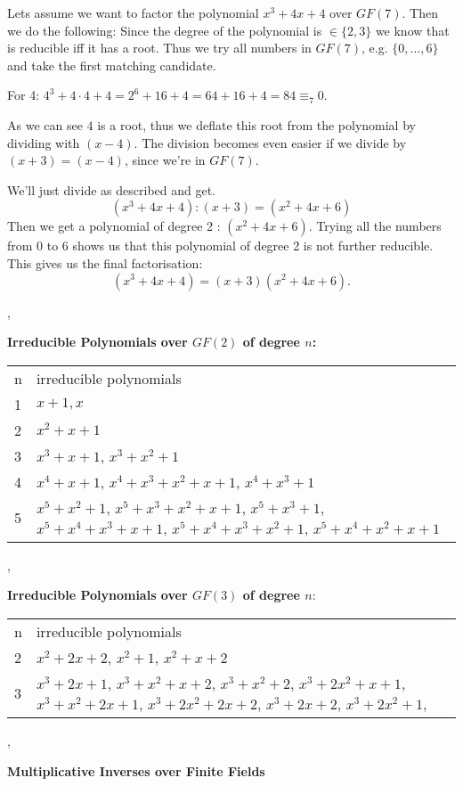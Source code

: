 Lets assume we want to factor the polynomial $x^3+4x+4$ over $GF(7)$. Then we do
the following: Since the degree of the polynomial is $\in\{2,3\}$ we know that
is reducible iff it has a root. Thus we try all numbers in $GF(7)$, e.g.
$\{0,\ldots,6\}$ and take the first matching candidate.

For 4: $4^3+4\cdot 4 + 4 = 2^6 +16 + 4 = 64 + 16 + 4 = 84 \equiv_7 0$.

As we can see $4$ is a root, thus we deflate this root from the polynomial by
dividing with $(x-4)$. The division becomes even easier if we divide by
$(x+3)=(x-4)$, since we're in $GF(7)$.

We'll just divide as described and get.
\[
(x^3+4x+4) : (x+3) = (x^2+4x+6)
\]
Then we get a polynomial of degree 2 : $(x^2+4x+6)$. Trying all the numbers from
0 to 6 shows us that this polynomial of degree 2 is not further reducible. This
gives us the final factorisation:
\[
(x^3+4x+4) = (x+3)(x^2+4x+6).
\]

\sep

\textbf{Irreducible Polynomials over $GF(2)$ of degree $n$:}

\begin{tabular}{lp{}}
n	& irreducible polynomials\\
1	& $x+1, x$\\
2	& $x^2+x+1$\\
3	& $x^3+x+1$, $x^3+x^2+1$\\
4	& $x^4+x+1$, $x^4+x^3+x^2+x+1$,  $x^4+x^3+1$\\
5   & $x^5+x^2+1$, $x^5+x^3+x^2+x+1$, $x^5+x^3+1$, $x^5+x^4+x^3+x+1$,
$x^5+x^4+x^3+x^2+1$, $x^5+x^4+x^2+x+1$
\end{tabular}

\sep

\textbf{Irreducible Polynomials over $GF(3)$ of degree $n$}:
\begin{tabular}{lp{}}
n	& irreducible polynomials\\
2	& $x^2 + 2x + 2$, $x^2 + 1$, $x^2 + x + 2$\\
3	& $x^3 + 2x + 1$,
$x^3 + x^2 + x + 2$, 
$x^3 + x^2 + 2$, 
$x^3 + 2x^2 + x + 1$, 
$x^3 + x^2 + 2x + 1$, 
$x^3 + 2x^2 + 2x + 2$, 
$x^3 + 2x + 2$, 
$x^3 + 2x^2 + 1$, 
\end{tabular}

\sep

\textbf{Multiplicative Inverses over Finite Fields}

